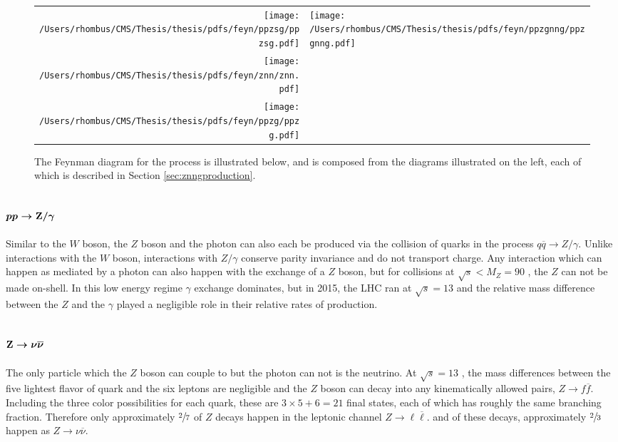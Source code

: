\begin{figure}[!h]
 \center
 \caption[Feynman diagrams for \ppzgnng]{
  The Feynman diagram for the process
   \ppzgnng is illustrated below,
   and is composed from the diagrams 
   illustrated on the left, each of which is
   described in Section \ref{sec:znngproduction}.
 } 
\begin{tabular}{rl}
 \texttt{[image: /Users/rhombus/CMS/Thesis/thesis/pdfs/feyn/ppzsg/ppzsg.pdf]} & 
 \multirow{3}{*}{\texttt{[image: /Users/rhombus/CMS/Thesis/thesis/pdfs/feyn/ppzgnng/ppzgnng.pdf]}} \\
 \texttt{[image: /Users/rhombus/CMS/Thesis/thesis/pdfs/feyn/znn/znn.pdf]} & {} \\
 \texttt{[image: /Users/rhombus/CMS/Thesis/thesis/pdfs/feyn/ppzg/ppzg.pdf]} & {} 
\end{tabular} 
    \label{fig:ppwbblnbbfeyn}
\end{figure}

 \subsection[\ppzsg]
 {$\boldsymbol{pp\rightarrow \mathrm{Z}/\gamma}$}

 Similar to the $W$ boson, the $Z$ boson and the photon can
  also each be produced via the collision of quarks in
  the process $q\overline{q} \rightarrow Z/\gamma$.
 Unlike interactions with the $W$ boson, 
  interactions with $Z/\gamma$ conserve parity invariance
  and do not transport charge.
 Any interaction which can happen as mediated
  by a photon can also happen with the exchange
  of a $Z$ boson, but for collisions at $\sqrt{s}<M_Z = 90$ \GeV,
  the $Z$ can not be made on-shell.
 In this low energy regime $\gamma$ exchange dominates,
  but in 2015, the LHC ran at $\sqrt{s}=13$ \TeV
  and the relative mass difference between the $Z$ and the $\gamma$
  played a negligible role in their relative rates of production. 


 \subsection[\znn]
 {$\boldsymbol{\mathrm{Z}\rightarrow\nu\overline{\nu}}$}

 The only particle which the $Z$ boson can couple to 
  but the photon can not is the neutrino.
 At $\sqrt{s}=13$ \TeV, the mass differences between
  the five lightest flavor of quark and the six 
  leptons are negligible and the $Z$ boson
  can decay into any kinematically allowed pairs,
  $Z\rightarrow f\overline{f}$.
 Including the three color possibilities
  for each quark, these are $3\times 5 + 6 = 21$ final states,
  each of which has roughly the same branching
  fraction. 
 Therefore only approximately $\sfrac{2}{7}$ of $Z$
  decays happen in the leptonic channel $Z\rightarrow \ell \overline{\ell}$.
  and of these decays, approximately $\sfrac{2}{3}$ happen
  as $Z\rightarrow \nu\overline{\nu}$.

